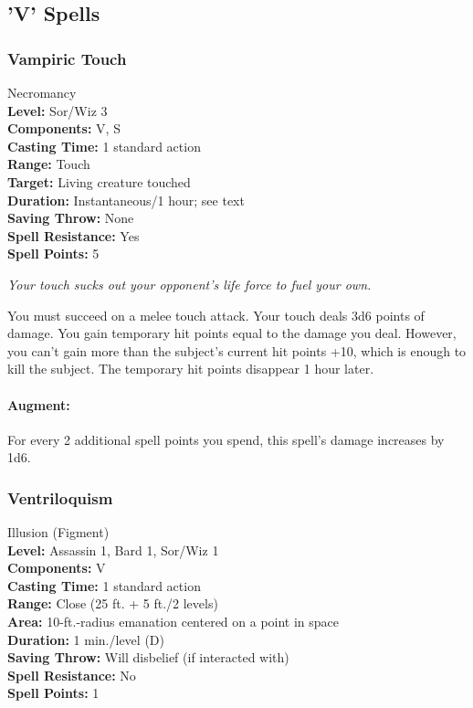 \subsection{'V' Spells}
\subsubsection{Vampiric Touch}
\label{Spell:VampiricTouch}
Necromancy
\\ \textbf{Level:} Sor/Wiz 3
\\ \textbf{Components:} V, S
\\ \textbf{Casting Time:} 1 standard action
\\ \textbf{Range:} Touch
\\ \textbf{Target:} Living creature touched
\\ \textbf{Duration:} Instantaneous/1 hour; see text
\\ \textbf{Saving Throw:} None
\\ \textbf{Spell Resistance:} Yes
\\ \textbf{Spell Points:} 5

\emph{Your touch sucks out your opponent's life force to fuel your own.}

You must succeed on a melee touch attack. 
Your touch deals 3d6 points of damage. 
You gain temporary hit points equal to the damage you deal. 
However, you can't gain more than the subject's current hit points +10, which is enough to kill the subject. 
The temporary hit points disappear 1 hour later.

\paragraph{Augment:} For every 2 additional spell points you spend, this spell's damage increases by 1d6.

\subsubsection{Ventriloquism}
\label{Spell:Ventriloquism}
Illusion (Figment)
\\ \textbf{Level:} Assassin 1, Bard 1, Sor/Wiz 1
\\ \textbf{Components:} V
\\ \textbf{Casting Time:} 1 standard action
\\ \textbf{Range:} Close (25 ft. + 5 ft./2 levels)
\\ \textbf{Area:} 10-ft.-radius emanation centered on a point in space
\\ \textbf{Duration:} 1 min./level (D)
\\ \textbf{Saving Throw:} Will disbelief (if interacted with)
\\ \textbf{Spell Resistance:} No
\\ \textbf{Spell Points:} 1


